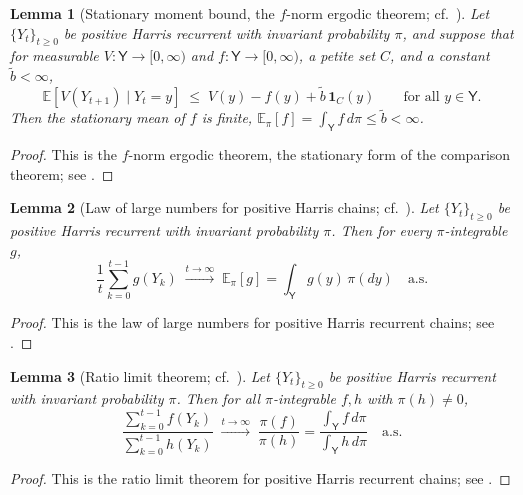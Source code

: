 \documentclass[11pt]{article}
\newtheorem{lem}{Lemma}
\theoremstyle{definition}
\begin{document}
\begin{lem}[Stationary moment bound, the $f$-norm ergodic theorem; cf.\ {\cite[Thm.~14.3.7]{MeynTweedie2009}}]
\label{lem:moment}
Let $\{Y_t\}_{t \geq 0}$ be positive Harris recurrent with invariant probability $\pi$, and suppose that for measurable $V \colon \mathsf{Y} \to [0, \infty)$ and $f \colon \mathsf{Y} \to [0, \infty)$, a petite set $C$, and a constant $\tilde b < \infty$,
\[
  \mathbb{E}[V(Y_{t+1}) \mid Y_t = y] \;\leq\; V(y) - f(y) + \tilde b\,\mathbf{1}_C(y) \qquad \text{for all } y \in \mathsf{Y}.
\]
Then the stationary mean of $f$ is finite, $\mathbb{E}_\pi[f] = \int_{\mathsf{Y}} f\,d\pi \leq \tilde b < \infty$.
\end{lem}
\begin{proof}
This is the $f$-norm ergodic theorem, the stationary form of the comparison theorem; see \cite[Thm.~14.3.7]{MeynTweedie2009}.
\end{proof}

\begin{lem}[Law of large numbers for positive Harris chains; cf.\ {\cite[Thm.~17.1.7]{MeynTweedie2009}}]
\label{lem:LLN}
Let $\{Y_t\}_{t \geq 0}$ be positive Harris recurrent with invariant probability $\pi$. Then for every $\pi$-integrable $g$,
\[
  \frac1t\sum_{k=0}^{t-1} g(Y_k) \;\xrightarrow{t \to \infty}\; \mathbb{E}_\pi[g] = \int_{\mathsf{Y}} g(y)\,\pi(dy) \quad \text{a.s.}
\]
\end{lem}
\begin{proof}
This is the law of large numbers for positive Harris recurrent chains; see \cite[Thm.~17.1.7]{MeynTweedie2009}.
\end{proof}

\begin{lem}[Ratio limit theorem; cf.\ {\cite[Thm.~17.3.2]{MeynTweedie2009}}]
\label{lem:ratio}
Let $\{Y_t\}_{t \geq 0}$ be positive Harris recurrent with invariant probability $\pi$. Then for all $\pi$-integrable $f, h$ with $\pi(h) \neq 0$,
\[
  \frac{\sum_{k=0}^{t-1} f(Y_k)}{\sum_{k=0}^{t-1} h(Y_k)} \;\xrightarrow{t \to \infty}\; \frac{\pi(f)}{\pi(h)} = \frac{\int_{\mathsf{Y}} f\,d\pi}{\int_{\mathsf{Y}} h\,d\pi} \quad \text{a.s.}
\]
\end{lem}
\begin{proof}
This is the ratio limit theorem for positive Harris recurrent chains; see \cite[Thm.~17.3.2]{MeynTweedie2009}.
\end{proof}
\end{document}
